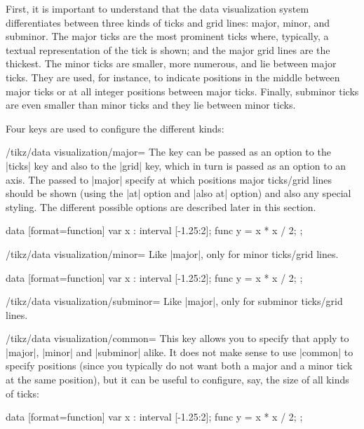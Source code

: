 First, it is important to understand that the data visualization
system differentiates between three kinds of 
ticks and grid lines: major, minor, and subminor. The major ticks are
the most prominent ticks where, typically, a textual representation of
the tick is shown; and the major grid lines are the thickest. The
minor ticks are smaller, more numerous, and lie between major
ticks. They are used, for instance, to indicate positions in the
middle between major ticks or at all integer positions between major
ticks. Finally, subminor ticks are even smaller than minor ticks and
they lie between minor ticks. 

Four keys are used to configure the different kinds:

\begin{key}{/tikz/data visualization/major=}
  The key can be passed as an option to the |ticks| key and also to
  the |grid| key, which in turn is passed as an option to an axis. The
   passed to |major| specify at which positions
  major ticks/grid lines should be shown (using the |at| option and
  |also at| option) and also any special styling. The different
  possible options are described later in this section.
\begin{codeexample}[]
\tikz \datavisualization
  [ school book axes, visualize as smooth line,
    x axis={ticks={major={at={1, 1.5, 2}}}}]
  data [format=function] {
    var x : interval [-1.25:2];
    func y = \value x * \value x / 2;
  };
\end{codeexample}
\end{key}

\begin{key}{/tikz/data visualization/minor=}
  Like |major|, only for minor ticks/grid lines.
\begin{codeexample}[]
\tikz \datavisualization
  [ school book axes, visualize as smooth line,
    x axis={grid={minor={at={1, 1.5, 2}}}}]
  data [format=function] {
    var x : interval [-1.25:2];
    func y = \value x * \value x / 2;
  };
\end{codeexample}
\end{key}

\begin{key}{/tikz/data visualization/subminor=}
  Like |major|, only for subminor ticks/grid lines.
\end{key}


\begin{key}{/tikz/data visualization/common=}
  This key allows you to specify  that apply to |major|,
  |minor| and |subminor| alike. It does not make sense to use |common|
  to specify positions (since you typically do not want both a major
  and a minor tick at the same position), but it can be useful to
  configure, say, the size of all kinds of ticks:
\begin{codeexample}[]
\tikz \datavisualization
  [ school book axes, visualize as smooth line,
    x axis={ticks={minor steps between steps, common={low=0}}} ]
  data [format=function] {
    var x : interval [-1.25:2];
    func y = \value x * \value x / 2;
  };
\end{codeexample}
\end{key}



